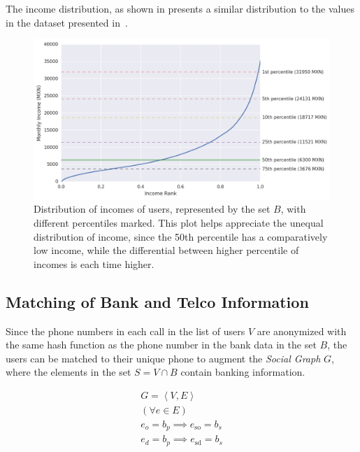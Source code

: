 The income distribution, as shown in  presents a similar distribution to the values in the dataset presented in~.

\begin{figure}
\raggedright{}
\includegraphics[width=1.15\textwidth]{figures/incomedistribution.png}
\caption{Distribution of incomes of users, represented by the set $B$, with different percentiles marked. This plot helps appreciate the unequal distribution of income, since the 50th percentile has a comparatively low income, while the differential between higher percentile of incomes is each time higher.}
\label{fig:incomedistribution}
\end{figure}

\subsection{Matching of Bank and Telco Information}

Since the phone numbers in each call in the list of users $V$ are anonymized with the same hash function as the phone number in the bank data in the set $B$, the users can be matched to their unique phone to augment the \emph{Social Graph} $G$, where the elements in the set $S = V \cap B$ contain banking information.

\begin{equation}
\label{eq:banktelcojoin}
\begin{gathered}
G = \left< V, E \right> \\
( \forall e \in E ) \\
e_o = b_p \implies e_{\operatorname{so}} = b_s \\
e_d = b_p \implies e_{\operatorname{sd}} = b_s \\
\end{gathered}
\end{equation}

